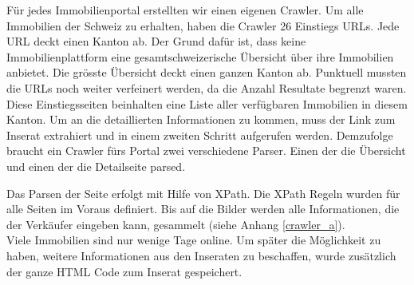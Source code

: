 Für jedes Immobilienportal erstellten wir einen eigenen Crawler. Um alle Immobilien der Schweiz zu erhalten, haben die Crawler 26 Einstiegs URLs. Jede URL deckt einen Kanton ab. Der Grund dafür ist, dass keine Immobilienplattform eine gesamtschweizerische Übersicht über ihre Immobilien anbietet. Die grösste Übersicht deckt einen ganzen Kanton ab. Punktuell mussten die URLs noch weiter verfeinert werden, da die Anzahl Resultate begrenzt waren.\\
Diese Einstiegsseiten beinhalten eine Liste aller verfügbaren Immobilien in diesem Kanton. Um an die detaillierten Informationen zu kommen, muss der Link zum Inserat extrahiert und in einem zweiten Schritt aufgerufen werden.
Demzufolge braucht ein Crawler fürs Portal zwei verschiedene Parser. Einen der die Übersicht und einen der die Detailseite parsed.

Das Parsen der Seite erfolgt mit Hilfe von XPath. Die XPath Regeln wurden für alle Seiten im Voraus definiert. Bis auf die Bilder werden alle Informationen, die der Verkäufer eingeben kann, gesammelt (siehe Anhang \ref{crawler_a}).\\
Viele Immobilien sind nur wenige Tage online. Um später die Möglichkeit zu haben, weitere Informationen aus den Inseraten zu beschaffen, wurde zusätzlich der ganze HTML Code zum Inserat gespeichert.

